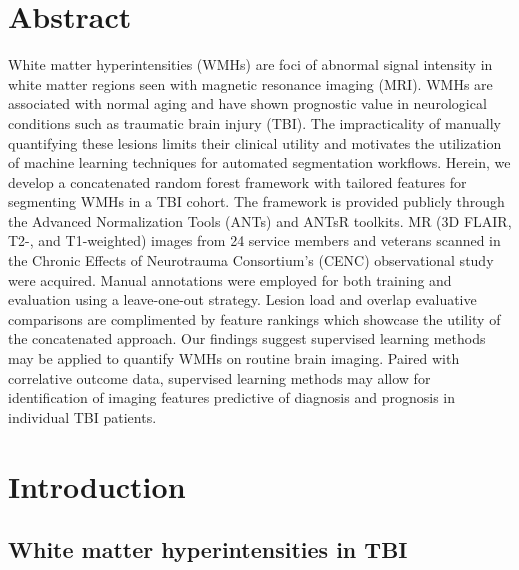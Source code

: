 \documentclass[11pt,]{article}
\title{}
\author{}
\date{}
\begin{document}
\maketitle


\section{Abstract}\label{abstract}

White matter hyperintensities (WMHs) are foci of abnormal signal
intensity in white matter regions seen with magnetic resonance imaging
(MRI). WMHs are associated with normal aging and have shown prognostic
value in neurological conditions such as traumatic brain injury (TBI).
The impracticality of manually quantifying these lesions limits their
clinical utility and motivates the utilization of machine learning
techniques for automated segmentation workflows. Herein, we develop a
concatenated random forest framework with tailored features for
segmenting WMHs in a TBI cohort. The framework is provided publicly
through the Advanced Normalization Tools (ANTs) and ANTsR toolkits. MR
(3D FLAIR, T2-, and T1-weighted) images from 24 service members and
veterans scanned in the Chronic Effects of Neurotrauma Consortium's
(CENC) observational study were acquired. Manual annotations were
employed for both training and evaluation using a leave-one-out
strategy. Lesion load and overlap evaluative comparisons are
complimented by feature rankings which showcase the utility of the
concatenated approach. Our findings suggest supervised learning methods
may be applied to quantify WMHs on routine brain imaging. Paired with
correlative outcome data, supervised learning methods may allow for
identification of imaging features predictive of diagnosis and prognosis
in individual TBI patients.

\clearpage

\section{Introduction}\label{introduction}

\subsection{White matter hyperintensities in
TBI}\label{white-matter-hyperintensities-in-tbi}
\end{document}
